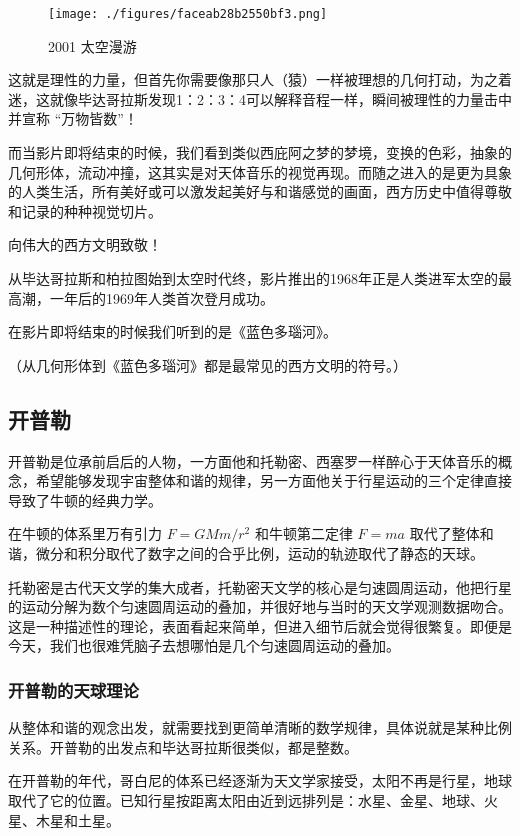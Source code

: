 \begin{figure}[ht]
\centering
\texttt{[image: ./figures/faceab28b2550bf3.png]}
\caption{2001 太空漫游} \label{fig_ClBohr_5}
\end{figure}


这就是理性的力量，但首先你需要像那只人（猿）一样被理想的几何打动，为之着迷，这就像毕达哥拉斯发现1：2：3：4可以解释音程一样，瞬间被理性的力量击中并宣称 “万物皆数”！

而当影片即将结束的时候，我们看到类似西庇阿之梦的梦境，变换的色彩，抽象的几何形体，流动冲撞，这其实是对天体音乐的视觉再现。而随之进入的是更为具象的人类生活，所有美好或可以激发起美好与和谐感觉的画面，西方历史中值得尊敬和记录的种种视觉切片。

向伟大的西方文明致敬！

从毕达哥拉斯和柏拉图始到太空时代终，影片推出的1968年正是人类进军太空的最高潮，一年后的1969年人类首次登月成功。

在影片即将结束的时候我们听到的是《蓝色多瑙河》。

（从几何形体到《蓝色多瑙河》都是最常见的西方文明的符号。）


\subsection{开普勒}

开普勒是位承前启后的人物，一方面他和托勒密、西塞罗一样醉心于天体音乐的概念，希望能够发现宇宙整体和谐的规律，另一方面他关于行星运动的三个定律直接导致了牛顿的经典力学。

在牛顿的体系里万有引力 $F = G M m /r^2$ 和牛顿第二定律 $F = ma$ 取代了整体和谐，微分和积分取代了数字之间的合乎比例，运动的轨迹取代了静态的天球。

托勒密是古代天文学的集大成者，托勒密天文学的核心是匀速圆周运动，他把行星的运动分解为数个匀速圆周运动的叠加，并很好地与当时的天文学观测数据吻合。这是一种描述性的理论，表面看起来简单，但进入细节后就会觉得很繁复。即便是今天，我们也很难凭脑子去想哪怕是几个匀速圆周运动的叠加。

\subsubsection{开普勒的天球理论}

从整体和谐的观念出发，就需要找到更简单清晰的数学规律，具体说就是某种比例关系。开普勒的出发点和毕达哥拉斯很类似，都是整数。

在开普勒的年代，哥白尼的体系已经逐渐为天文学家接受，太阳不再是行星，地球取代了它的位置。已知行星按距离太阳由近到远排列是：水星、金星、地球、火星、木星和土星。

